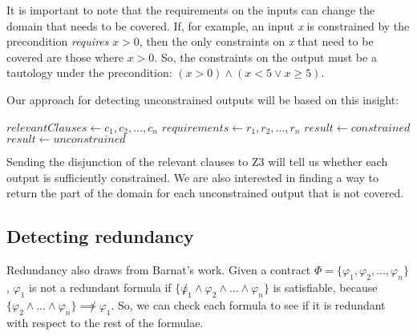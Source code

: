 \documentclass{article}
\newif\ifcomments
\newcommand{\egm}[1]{\ifcomments\textcolor{orange}{egm: #1}\fi}
\newcommand{\cass}[1]{\ifcomments\textcolor{blue}{cass: #1}\fi}
\begin{document}
It is important to note that the requirements on the inputs can change the domain that needs to be covered. If, for example, 
an input {\it x} is constrained by the precondition {\it requires} \(x > 0\), then the only constraints on {\it x} that need to 
be covered are those where \(x > 0\). So, the constraints on the output must be a tautology under the precondition: 
\((x > 0) \land (x < 5 \lor x \geq 5)\).

Our approach for detecting unconstrained outputs will be based on this insight:
\break

\begin{algorithmic}

    \State $relevantClauses \gets c_{1}, c_{2}, ..., c_{n}$ 
    \State $requirements \gets r_{1}, r_{2}, ..., r_{n}$
        \State $result \gets constrained$
    \Else
        \State $result \gets unconstrained$
    \EndIf
\EndFor

\end{algorithmic}

Sending the disjunction of the relevant clauses to Z3 will tell us whether each output is sufficiently constrained. 
We are also interested in finding a way to return the part of the domain for each unconstrained output that
is not covered. 
\egm{OK. Interesting. So if the ensures form a tautalogy then the output is constrained under every input? How do the pre-conditions factor in? It would have to be a tautology under the pre-condition constraints. Right? How is that logically stated?}
\cass{Does what I wrote make sense? Anding the preconditions on to the disjunction of relevant clauses makes it so that we are only checking the relevant domain. I added that to the pseudocode}

\subsection{Detecting redundancy}

Redundancy also draws from Barnat's work. Given a contract \(\Phi = \{\varphi_{1}, \varphi_{2}, ..., \varphi_{n}\}\),
\(\varphi_{1}\) is not a redundant formula if \(\{\not \varphi_{1} \land \varphi_{2} \land ... \land \varphi_{n}\}\)
is satisfiable, because \(\{\varphi_{2} \land ... \land \varphi_{n}\} \not\implies \varphi_{1}\). So, we can check
each formula to see if it is redundant with respect to the rest of the formulae. 
\end{document}
